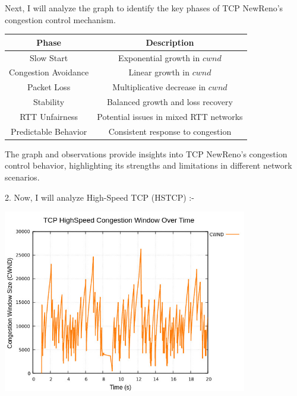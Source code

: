 \documentclass[11pt,a4paper]{article}
\begin{document}
Next, I will analyze the graph to identify the key phases of TCP NewReno's congestion control mechanism.
\begin{center}
    \begin{tabular}{|c|c|}
        \hline
        \textbf{Phase} & \textbf{Description} \\
        \hline
        Slow Start & Exponential growth in $cwnd$ \\
        Congestion Avoidance & Linear growth in $cwnd$ \\
        Packet Loss & Multiplicative decrease in $cwnd$ \\
        Stability & Balanced growth and loss recovery \\
        RTT Unfairness & Potential issues in mixed RTT networks \\
        Predictable Behavior & Consistent response to congestion \\
        \hline
    \end{tabular}
\end{center}

The graph and observations provide insights into TCP NewReno's congestion control behavior, highlighting its strengths and limitations in different network scenarios.

2. Now, I will analyze High-Speed TCP (HSTCP) :-
\begin{center}
    \includegraphics[width=0.8\textwidth]{images/highspeed_cwnd.jpg}
\end{center}
\end{document}
